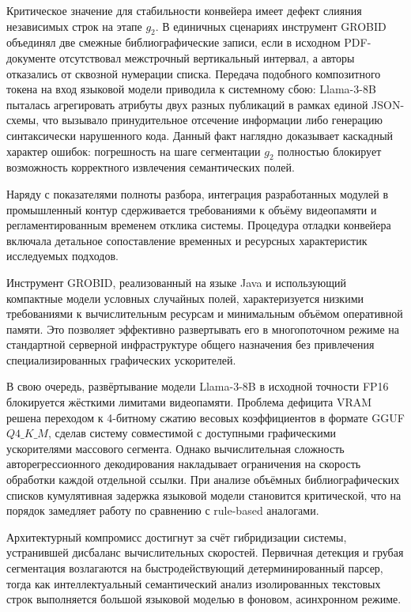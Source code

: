 Критическое значение для стабильности конвейера имеет дефект слияния независимых строк на этапе $g_2$. В единичных сценариях инструмент GROBID объединял две смежные библиографические записи, если в исходном PDF-документе отсутствовал межстрочный вертикальный интервал, а авторы отказались от сквозной нумерации списка. Передача подобного композитного токена на вход языковой модели приводила к системному сбою: Llama-3-8B пыталась агрегировать атрибуты двух разных публикаций в рамках единой JSON-схемы, что вызывало принудительное отсечение информации либо генерацию синтаксически нарушенного кода. Данный факт наглядно доказывает каскадный характер ошибок: погрешность на шаге сегментации $g_2$ полностью блокирует возможность корректного извлечения семантических полей.

Наряду с показателями полноты разбора, интеграция разработанных модулей в промышленный контур сдерживается требованиями к объёму видеопамяти и регламентированным временем отклика системы. Процедура отладки конвейера включала детальное сопоставление временных и ресурсных характеристик исследуемых подходов.

Инструмент GROBID, реализованный на языке Java и использующий компактные модели условных случайных полей, характеризуется низкими требованиями к вычислительным ресурсам и минимальным объёмом оперативной памяти. Это позволяет эффективно развертывать его в многопоточном режиме на стандартной серверной инфраструктуре общего назначения без привлечения специализированных графических ускорителей.

В свою очередь, развёртывание модели Llama-3-8B в исходной точности FP16 блокируется жёсткими лимитами видеопамяти. Проблема дефицита VRAM решена переходом к 4-битному сжатию весовых коэффициентов в формате GGUF $Q4\_K\_M$, сделав систему совместимой с доступными графическими ускорителями массового сегмента. Однако вычислительная сложность авторегрессионного декодирования накладывает ограничения на скорость обработки каждой отдельной ссылки. При анализе объёмных библиографических списков кумулятивная задержка языковой модели становится критической, что на порядок замедляет работу по сравнению с rule-based аналогами.

Архитектурный компромисс достигнут за счёт гибридизации системы, устранившей дисбаланс вычислительных скоростей. Первичная детекция и грубая сегментация возлагаются на быстродействующий детерминированный парсер, тогда как интеллектуальный семантический анализ изолированных текстовых строк выполняется большой языковой моделью в фоновом, асинхронном режиме.

